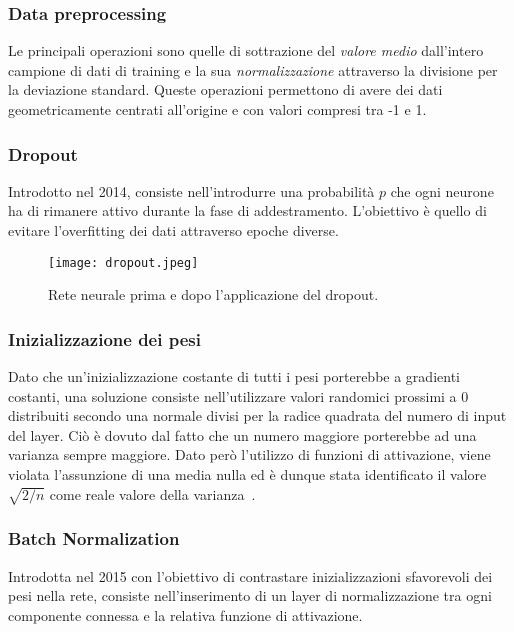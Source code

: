 \subsubsection{Data preprocessing}

Le principali operazioni sono quelle di sottrazione del \textit{valore medio} dall'intero campione di dati di training e la sua \textit{normalizzazione} attraverso la divisione per la deviazione standard. Queste operazioni permettono di avere dei dati geometricamente centrati all'origine e con valori compresi tra -1 e 1.


\subsubsection{Dropout}

Introdotto nel 2014\cite{dropout}, consiste nell'introdurre una probabilità $p$ che ogni neurone ha di rimanere attivo durante la fase di addestramento. L'obiettivo è quello di evitare l'overfitting dei dati attraverso epoche diverse.

\begin{figure}[H]
	\centering
	\texttt{[image: dropout.jpeg]}
	\caption{Rete neurale prima e dopo l'applicazione del dropout.}
\label{fig:dropout}
\end{figure}



\subsubsection{Inizializzazione dei pesi}

Dato che un'inizializzazione costante di tutti i pesi porterebbe a gradienti costanti, una soluzione consiste nell'utilizzare valori randomici prossimi a 0 distribuiti secondo una normale divisi per la radice quadrata del numero di input del layer. Ciò è dovuto dal fatto che un numero maggiore porterebbe ad una varianza sempre maggiore.
Dato però l'utilizzo di funzioni di attivazione, viene violata l'assunzione di una media nulla ed è dunque stata identificato il valore $\sqrt{2/n}$ come reale valore della varianza~\cite{he2015delving}.


\subsubsection{Batch Normalization}

Introdotta nel 2015\cite{batchnorm} con l'obiettivo di contrastare inizializzazioni sfavorevoli dei pesi nella rete, consiste nell'inserimento di un layer di normalizzazione tra ogni componente connessa e la relativa funzione di attivazione.


